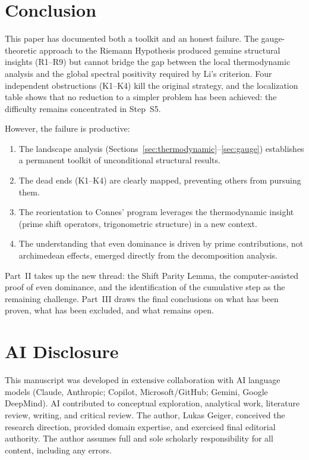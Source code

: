 \documentclass[12pt,a4paper]{article}
\theoremstyle{definition}
\theoremstyle{remark}
\begin{document}
\section{Conclusion}
\label{sec:conclusion}

This paper has documented both a toolkit and an honest failure. The gauge-theoretic approach to the Riemann Hypothesis produced genuine structural insights (R1--R9) but cannot bridge the gap between the local thermodynamic analysis and the global spectral positivity required by Li's criterion. Four independent obstructions (K1--K4) kill the original strategy, and the localization table shows that no reduction to a simpler problem has been achieved: the difficulty remains concentrated in Step~S5.

However, the failure is productive:
\begin{enumerate}
  \item The landscape analysis (Sections~\ref{sec:thermodynamic}--\ref{sec:gauge}) establishes a permanent toolkit of unconditional structural results.
  \item The dead ends (K1--K4) are clearly mapped, preventing others from pursuing them.
  \item The reorientation to Connes' program leverages the thermodynamic insight (prime shift operators, trigonometric structure) in a new context.
  \item The understanding that even dominance is driven by prime contributions, not archimedean effects, emerged directly from the decomposition analysis.
\end{enumerate}

Part~II takes up the new thread: the Shift Parity Lemma, the computer-assisted proof of even dominance, and the identification of the cumulative step as the remaining challenge. Part~III draws the final conclusions on what has been proven, what has been excluded, and what remains open.


\section*{AI Disclosure}

This manuscript was developed in extensive collaboration with AI language models (Claude, Anthropic; Copilot, Microsoft/GitHub; Gemini, Google DeepMind). AI contributed to conceptual exploration, analytical work, literature review, writing, and critical review. The author, Lukas Geiger, conceived the research direction, provided domain expertise, and exercised final editorial authority. The author assumes full and sole scholarly responsibility for all content, including any errors.
\end{document}
